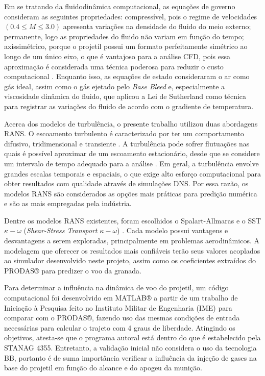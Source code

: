 Em se tratando da fluidodinâmica computacional, as equações de governo consideram as seguintes propriedades: compressível, pois o regime de velocidades \(\left(\num{0,4} \leq M \leq \num{3,0}\right)\) apresenta variações na densidade do fluido do meio externo; permanente, logo as propriedades do fluido não variam em função do tempo; axissimétrico, porque o projetil possui um formato perfeitamente simétrico ao longo de um único eixo, o que é vantajoso para a análise CFD, pois essa aproximação é considerada uma técnica poderosa para reduzir o custo computacional \cite{Lucena2020}. Enquanto isso, as equações de estado consideraram o ar como gás ideal, assim como o gás ejetado pelo \textit{Base Bleed} e, especialmente a viscosidade dinâmica do fluido, que aplicou a Lei de Sutherland como técnica para registrar as variações do fluido de acordo com o gradiente de temperatura.

Acerca dos modelos de turbulência, o presente trabalho utilizou duas abordagens RANS. O escoamento turbulento é caracterizado por ter um comportamento difusivo, tridimensional e transiente \cite{Rezende2009}. A turbulência pode sofrer flutuações nas quais é possível aproximar de um escoamento estacionário, desde que se considere um intervalo de tempo adequado para a análise \cite{Souza2011,SilveiraNeto2002}. Em geral, a turbulência envolve grandes escalas temporais e espaciais, o que exige alto esforço computacional para obter resultados com qualidade através de simulações DNS. Por essa razão, os modelos RANS são considerados as opções mais práticas para predição numérica e são as mais empregadas pela indústria.
	
Dentre os modelos RANS existentes, foram escolhidos o Spalart-Allmaras \cite{Spalart1992} e o SST \(\kappa-\omega\) (\textit{Shear-Stress Transport} \(\kappa-\omega\)) \cite{Menter1994TwoequationET,Menter2003,Menter2009}. Cada modelo possui vantagens e desvantagens a serem exploradas, principalmente em problemas aerodinâmicos. A modelagem que oferecer os resultados mais confiáveis terão seus valores acoplados ao simulador desenvolvido neste projeto, assim como os coeficientes extraídos do PRODAS® para predizer o voo da granada.

Para determinar a influência na dinâmica de voo do projetil, um código computacional foi desenvolvido em MATLAB® a partir de um trabalho de Iniciação à Pesquisa feito no Instituto Militar de Engenharia (IME) \cite{ThallyoENCIT2022,Thallyo2022} para comparar com o PRODAS®, fazendo uso das mesmas condições de entrada necessárias para calcular o trajeto com 4 graus de liberdade. Atingindo os objetivos, atesta-se que o programa autoral está dentro do que é estabelecido pela STANAG 4355. Entretanto, a validação inicial não considera o uso da tecnologia BB, portanto é de suma importância verificar a influência da injeção de gases na base do projetil em função do alcance e do apogeu da munição. 


